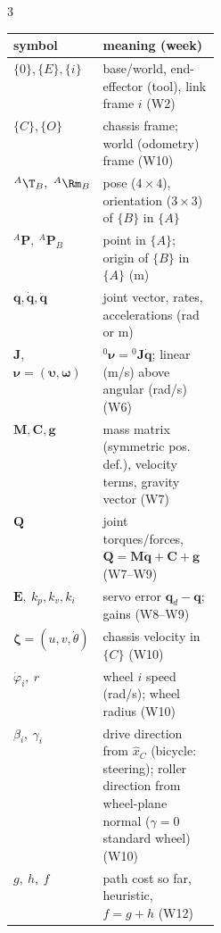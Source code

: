 \begin{multicols}{3}
\nopagebreak[4]
\begin{fbx}
\begin{tabularx}{\linewidth}{@{}>{\raggedright\arraybackslash}p{0.27\linewidth}X@{}}\toprule
symbol & meaning (week)\\\midrule
$\{0\},\{E\},\{i\}$ & base/world, end-effector (tool), link frame $i$ (W2)\\
$\{C\},\{O\}$ & chassis frame; world (odometry) frame (W10)\\
${}^A\T_B,\ {}^A\Rm_B$ & pose ($4\times4$), orientation ($3\times3$) of $\{B\}$ in $\{A\}$\\
${}^A\mathbf P,\ {}^A\mathbf P_B$ & point in $\{A\}$; origin of $\{B\}$ in $\{A\}$ (m)\\
$\mathbf q,\dot{\mathbf q},\ddot{\mathbf q}$ & joint vector, rates, accelerations (rad or m)\\
$\mathbf J$, $\boldsymbol\nu=(\boldsymbol\upsilon,\boldsymbol\omega)$ & ${}^0\boldsymbol\nu={}^0\mathbf J\dot{\mathbf q}$; linear (m/s) above angular (rad/s) (W6)\\
$\mathbf M,\mathbf C,\mathbf g$ & mass matrix (symmetric pos. def.), velocity terms, gravity vector (W7)\\
$\mathbf Q$ & joint torques/forces, $\mathbf Q=\mathbf M\ddot{\mathbf q}+\mathbf C+\mathbf g$ (W7--W9)\\
$\mathbf E,\ k_p,k_v,k_i$ & servo error $\mathbf q_d-\mathbf q$; gains (W8--W9)\\
$\boldsymbol\zeta=(u,v,\dot\theta)$ & chassis velocity in $\{C\}$ (W10)\\
$\dot\varphi_i,\ r$ & wheel $i$ speed (rad/s); wheel radius (W10)\\
$\beta_i,\ \gamma_i$ & drive direction from $\hat x_C$ (bicycle: steering); roller direction from wheel-plane normal ($\gamma=0$ standard wheel) (W10)\\
$g,\ h,\ f$ & path cost so far, heuristic, $f=g+h$ (W12)\\\bottomrule
\end{tabularx}
\end{fbx}
\end{multicols}
